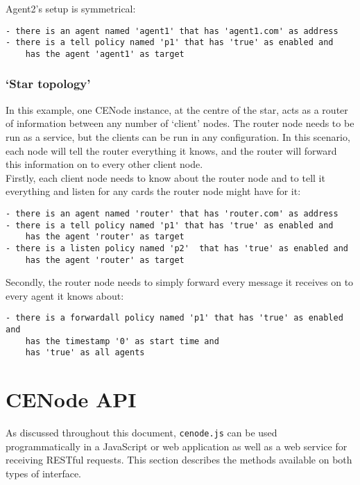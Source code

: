 \documentclass{scrartcl}
\begin{document}
Agent2's setup is symmetrical:\\
\begin{verbatim}
- there is an agent named 'agent1' that has 'agent1.com' as address
- there is a tell policy named 'p1' that has 'true' as enabled and 
    has the agent 'agent1' as target
\end{verbatim}


\subsubsection{`Star topology'}
In this example, one CENode instance, at the centre of the star, acts as a router of information between any number of `client' nodes. The router node needs to be run as a service, but the clients can be run in any configuration. In this scenario, each node will tell the router everything it knows, and the router will forward this information on to every other client node.\\

Firstly, each client node needs to know about the router node and to tell it everything and listen for any cards the router node might have for it:\\
\begin{verbatim}
- there is an agent named 'router' that has 'router.com' as address
- there is a tell policy named 'p1' that has 'true' as enabled and 
    has the agent 'router' as target
- there is a listen policy named 'p2'  that has 'true' as enabled and
    has the agent 'router' as target
\end{verbatim}

Secondly, the router node needs to simply forward every message it receives on to every agent it knows about:\\
\begin{verbatim}
- there is a forwardall policy named 'p1' that has 'true' as enabled and
    has the timestamp '0' as start time and 
    has 'true' as all agents
\end{verbatim}


\section{CENode API}
\label{api}
As discussed throughout this document, \texttt{cenode.js} can be used programmatically in a JavaScript or web application as well as a web service for receiving RESTful requests. This section describes the methods available on both types of interface.
\end{document}
